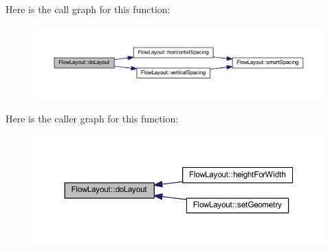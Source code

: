 Here is the call graph for this function\+:
\nopagebreak
\begin{figure}[H]
\begin{center}
\leavevmode
\includegraphics[width=350pt]{class_flow_layout_a2a2a9fba22a112465ac0ae090aeca28d_cgraph}
\end{center}
\end{figure}




Here is the caller graph for this function\+:
\nopagebreak
\begin{figure}[H]
\begin{center}
\leavevmode
\includegraphics[width=350pt]{class_flow_layout_a2a2a9fba22a112465ac0ae090aeca28d_icgraph}
\end{center}
\end{figure}


